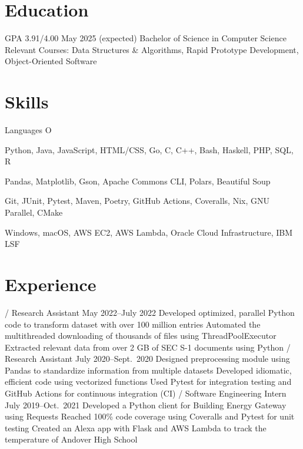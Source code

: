 \section{Education}
\begin{doutline}
     GPA 3.91/4.00
    \hfill May 2025 (expected)
        \2 Bachelor of Science in Computer Science
        \2 Relevant Courses: Data Structures \& Algorithms, Rapid Prototype Development, Object-Oriented Software
\end{doutline}

\section{Skills}
\begin{labeling}{Languages O}
    \item [Languages] Python, Java, JavaScript, HTML/CSS, Go, C, C++, Bash, Haskell, PHP, SQL, R
    \item [Libraries] Pandas, Matplotlib, Gson, Apache Commons CLI, Polars, Beautiful Soup
    \item [Tools] Git, JUnit, Pytest, Maven, Poetry, GitHub Actions, Coveralls, Nix, GNU Parallel, CMake
    \item [Platforms] Windows, macOS, AWS EC2, AWS Lambda, Oracle Cloud Infrastructure, IBM LSF
\end{labeling}

\section{Experience}
\begin{doutline}
     / Research Assistant
    \hfill May 2022--July 2022
        \2 Developed optimized, parallel Python code to transform dataset with over 100 million entries
        \2 Automated the multithreaded downloading of thousands of files using ThreadPoolExecutor
        \2 Extracted relevant data from over 2 GB of SEC S-1 documents using Python
     / Research Assistant
    \hfill July 2020--Sept.\ 2020
        \2 Designed preprocessing module using Pandas to standardize information from multiple datasets
            \3 Developed idiomatic, efficient code using vectorized functions
            \3 Used Pytest for integration testing and GitHub Actions for continuous integration (CI)
     / Software Engineering Intern
    \hfill July 2019--Oct.\ 2021
        \2 Developed a Python client for Building Energy Gateway using Requests
            \3 Reached 100\% code coverage using Coveralls and Pytest for unit testing
        \2 Created an Alexa app with Flask and AWS Lambda to track the temperature of Andover High School
\end{doutline}

